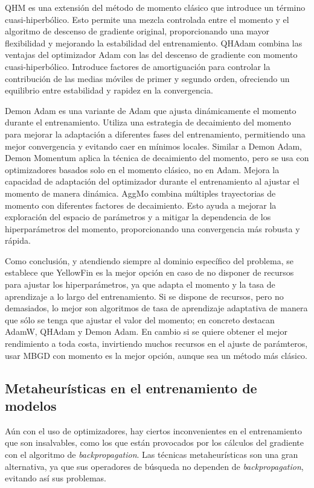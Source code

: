 QHM es una extensión del método de momento clásico que introduce un término cuasi-hiperbólico. Esto permite una mezcla controlada entre el momento y el algoritmo de descenso de gradiente original, proporcionando una mayor flexibilidad y mejorando la estabilidad del entrenamiento. QHAdam combina las ventajas del optimizador Adam con las del descenso de gradiente con momento cuasi-hiperbólico. Introduce factores de amortiguación para controlar la contribución de las medias móviles de primer y segundo orden, ofreciendo un equilibrio entre estabilidad y rapidez en la convergencia. 

Demon Adam es una variante de Adam que ajusta dinámicamente el momento durante el entrenamiento. Utiliza una estrategia de decaimiento del momento para mejorar la adaptación a diferentes fases del entrenamiento, permitiendo una mejor convergencia y evitando caer en mínimos locales. Similar a Demon Adam, Demon Momentum aplica la técnica de decaimiento del momento, pero se usa con optimizadores basados solo en el momento clásico, no en Adam. Mejora la capacidad de adaptación del optimizador durante el entrenamiento al ajustar el momento de manera dinámica. AggMo  combina múltiples trayectorias de momento con diferentes factores de decaimiento. Esto ayuda a mejorar la exploración del espacio de parámetros y a mitigar la dependencia de los hiperparámetros del momento, proporcionando una convergencia más robusta y rápida.


Como conclusión, y atendiendo siempre al dominio específico del problema, se establece que YellowFin es la mejor opción en caso de no disponer de recursos para ajustar los hiperparámetros, ya que adapta el momento y la tasa de aprendizaje a lo largo del entrenamiento. Si se dispone de recursos, pero no demasiados, lo mejor son algoritmos de tasa de aprendizaje adaptativa de manera que sólo se tenga que ajustar el valor del momento; en concreto destacan AdamW, QHAdam y Demon Adam. En cambio si se quiere obtener el mejor rendimiento a toda costa, invirtiendo muchos recursos en el ajuste de parámteros, usar MBGD con momento es la mejor opción, aunque sea un método más clásico.


\subsection{Metaheurísticas en el entrenamiento de modelos}

Aún con el uso de optimizadores, hay ciertos inconvenientes en el entrenamiento que son insalvables, como los que están provocados por los cálculos del gradiente con el algoritmo de \textit{backpropagation}. Las técnicas metaheurísticas son una gran alternativa, ya que sus operadores de búsqueda no dependen de \textit{backpropagation}, evitando así sus problemas. 

